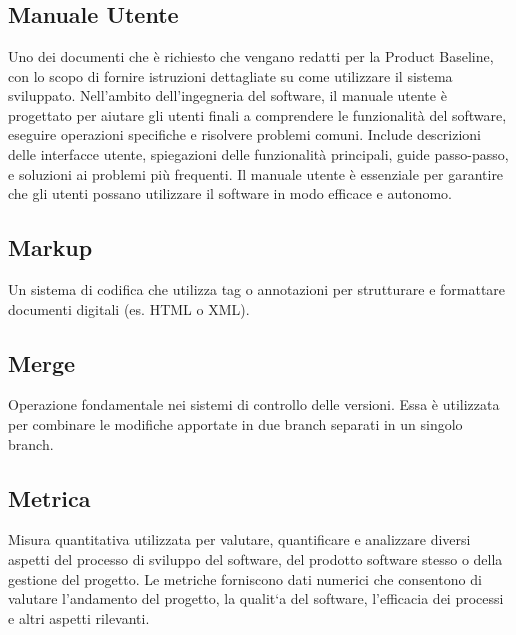 
\section{}

\hypertarget{sec:manuale_utente}{}
\subsection*{Manuale Utente}
Uno dei documenti che è richiesto che vengano redatti per la Product Baseline, con lo scopo di fornire istruzioni dettagliate su 
come utilizzare il sistema sviluppato. Nell'ambito dell'ingegneria del software, il manuale utente è progettato per aiutare gli 
utenti finali a comprendere le funzionalità del software, eseguire operazioni specifiche e risolvere problemi comuni. Include 
descrizioni delle interfacce utente, spiegazioni delle funzionalità principali, guide passo-passo, e soluzioni ai problemi più 
frequenti. Il manuale utente è essenziale per garantire che gli utenti possano utilizzare il software in modo efficace e autonomo. 

\hypertarget{sec:markup}{}
\subsection*{Markup}
Un sistema di codifica che utilizza tag o annotazioni per strutturare e formattare documenti digitali (es. HTML o XML).

\hypertarget{sec:merge}{}
\subsection*{Merge}
Operazione fondamentale nei sistemi di controllo delle versioni. Essa è utilizzata per combinare le modifiche apportate in due branch separati in un 
singolo branch.

\hypertarget{sec:metrica}{}
\subsection*{Metrica}
Misura quantitativa utilizzata per valutare, quantificare e analizzare diversi aspetti del processo di sviluppo del software, del prodotto software stesso o della gestione del
progetto. Le metriche forniscono dati numerici che consentono di valutare l’andamento del
progetto, la qualit`a del software, l’efficacia dei processi e altri aspetti rilevanti.

